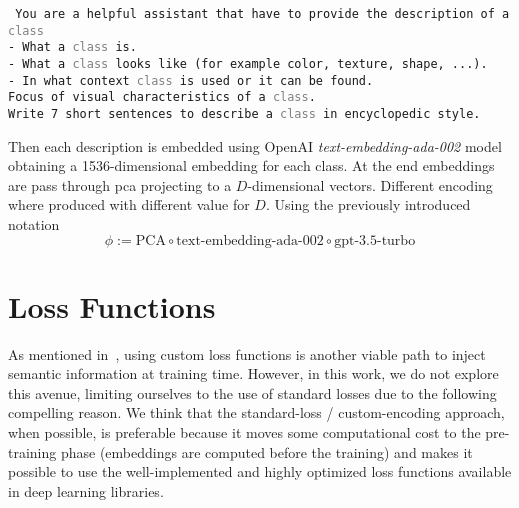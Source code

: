 \begin{minipage}{0.9\linewidth}
\texttt{\small
You are a helpful assistant that have to provide the description of a
\textquotesingle\textcolor{gray}{\texttt{class}}\textquotesingle\\
- What a \textquotesingle\textcolor{gray}{\texttt{class}}\textquotesingle\ is.\\
- What a \textquotesingle\textcolor{gray}{\texttt{class}}\textquotesingle\ looks like (for example color,
texture, shape, ...).\\
- In what context \textquotesingle\textcolor{gray}{\texttt{class}}\textquotesingle\ is used or it can be
found.\\
Focus of visual characteristics of a \textquotesingle\textcolor{gray}{\texttt{class}}\textquotesingle.\\
Write 7 short sentences to describe a \textquotesingle\textcolor{gray}{\texttt{class}}\textquotesingle\ in
encyclopedic style.
}
\end{minipage}

\vspace{10pt}

Then each description is embedded using OpenAI \emph{text-embedding-ada-002} model obtaining a 1536-dimensional embedding for each class. At the end embeddings are pass through \acrshort{pca} projecting to a $D$-dimensional vectors. Different encoding where produced with different value for $D$.
Using the previously introduced notation
\begin{equation}
  \phi := \textrm{PCA} \circ \textrm{text-embedding-ada-002} \circ
  \textrm{gpt-3.5-turbo}
  \label{eq:desc-pca}
\end{equation}


\section{Loss Functions}
\label{sec:losses}

As mentioned in~, using custom loss functions is another viable path to inject semantic information at training time. However, in this work, we do not explore this avenue, limiting ourselves to the use of standard losses due to the following compelling reason.
We think that the standard-loss / custom-encoding approach, when possible, is preferable because it moves some computational cost to the pre-training phase (embeddings are computed before the training) and makes it possible to use the well-implemented and highly optimized loss functions available in deep learning libraries.

